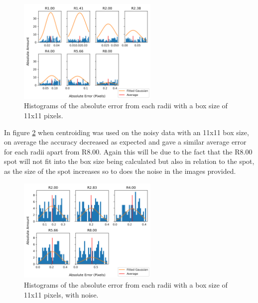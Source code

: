 \documentclass[aps,pra,a4paper,nofootinbib,onecolumn,tightenlines,longbibliography,12pt,amsfonts,amssymb,amsmath,floatfix]{revtex4-2} %
\begin{document}
  \begin{figure}[H]
    \begin{center}
      \includegraphics[width=0.6\textwidth]{project_pics/distro_centriod_11.png}
    \end{center}
    \caption{Histograms of the absolute error from each radii with a box size of 11x11 pixels.}
    \label{fig:box_11}
  \end{figure}
  
  In figure \ref{fig:box_11_noise} when centroiding was used on the noisy data with an 11x11 box size, 
  on average the accuracy decreased as expected and gave a similar average error for each radii apart from R8.00. 
  Again this will be due to the fact that the R8.00 spot will not fit into the box size being calculated 
  but also in relation to the spot, as the size of the spot increases so to does the noise in the images 
  provided.


  \begin{figure}[H]
    \begin{center}
      \includegraphics[width=0.6\textwidth]{project_pics/noise_cen_scatter_11.png}
    \end{center}
    \caption{Histograms of the absolute error from each radii with a box size of 11x11 pixels, with noise.}
    \label{fig:box_11_noise}
  \end{figure}
  
\end{document}

